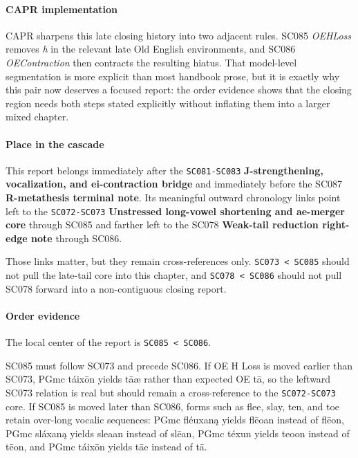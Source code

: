 \documentclass[
  british,
  a4paper,
]{article}
\begin{document}
\paragraph{CAPR implementation}\label{capr-implementation-51}

CAPR sharpens this late closing history into two adjacent rules. SC085
\emph{OEHLoss} removes \emph{h} in the relevant late Old English
environments, and SC086 \emph{OEContraction} then contracts the
resulting hiatus. That model-level segmentation is more explicit than
most handbook prose, but it is exactly why this pair now deserves a
focused report: the order evidence shows that the closing region needs
both steps stated explicitly without inflating them into a larger mixed
chapter.

\paragraph{Place in the cascade}\label{place-in-the-cascade-51}

This report belongs immediately after the \texttt{SC081-SC083}
\textbf{J-strengthening, vocalization, and ei-contraction bridge} and
immediately before the SC087 \textbf{R-metathesis terminal note}. Its
meaningful outward chronology links point left to the
\texttt{SC072-SC073} \textbf{Unstressed long-vowel shortening and
ae-merger core} through SC085 and farther left to the SC078
\textbf{Weak-tail reduction right-edge note} through SC086.

Those links matter, but they remain cross-references only.
\texttt{SC073\ \textless{}\ SC085} should not pull the late-tail core
into this chapter, and \texttt{SC078\ \textless{}\ SC086} should not
pull SC078 forward into a non-contiguous closing report.

\paragraph{Order evidence}\label{order-evidence-51}

The local center of the report is \texttt{SC085\ \textless{}\ SC086}.

SC085 must follow SC073 and precede SC086. If OE H Loss is moved earlier
than SC073, PGmc táixōn yields tāæ rather than expected OE tā, so the
leftward SC073 relation is real but should remain a cross-reference to
the \texttt{SC072-SC073} core. If SC085 is moved later than SC086, forms
such as flee, slay, ten, and toe retain over-long vocalic sequences:
PGmc fléuxaną yields flēoan instead of flēon, PGmc sláxaną yields sleaan
instead of slēan, PGmc téxun yields teoon instead of tēon, and PGmc
táixōn yields tāe instead of tā.
\end{document}

